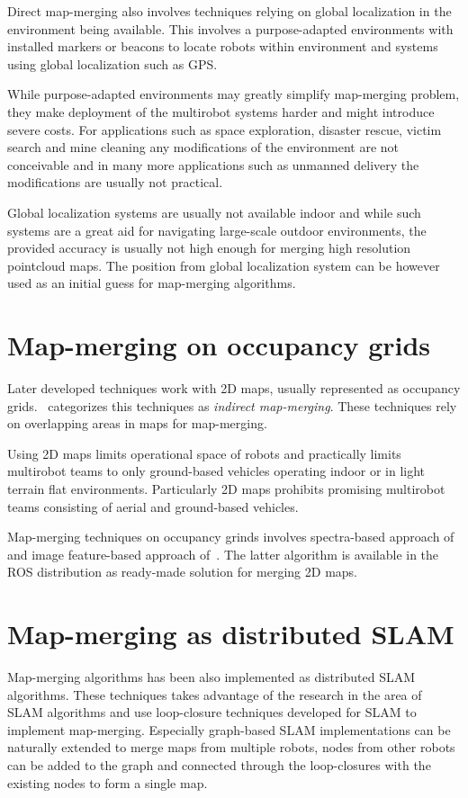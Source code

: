 Direct map-merging also involves techniques relying on global localization in the environment being available. This involves a purpose-adapted environments with installed markers or beacons to locate robots within environment and systems using global localization such as \gls{GPS}.

While purpose-adapted environments may greatly simplify map-merging problem, they make deployment of the multirobot systems harder and might introduce severe costs. For applications such as space exploration, disaster rescue, victim search and mine cleaning any modifications of the environment are not conceivable and in many more applications such as unmanned delivery the modifications are usually not practical.

Global localization systems are usually not available indoor and while such systems are a great aid for navigating large-scale outdoor environments, the provided accuracy is usually not high enough for merging high resolution pointcloud maps. The position from global localization system can be however used as an initial guess for map-merging algorithms.

\section{Map-merging on occupancy grids}

Later developed techniques work with 2D maps, usually represented as occupancy grids. \cite{lee2012survey}~categorizes this techniques as \textit{indirect map-merging}. These techniques rely on overlapping areas in maps for map-merging.

Using 2D maps limits operational space of robots and practically limits multirobot teams to only ground-based vehicles operating indoor or in light terrain flat environments. Particularly 2D maps prohibits promising multirobot teams consisting of aerial and ground-based vehicles.

Map-merging techniques on occupancy grinds involves spectra-based approach of~\cite{carpin2008spectra} and image feature-based approach of~\cite{Horner2016}. The latter algorithm is available in the \gls{ROS} distribution as ready-made solution for merging 2D maps.

\section{Map-merging as distributed SLAM}

Map-merging algorithms has been also implemented as distributed \gls{SLAM} algorithms. These techniques takes advantage of the research in the area of \gls{SLAM} algorithms and use loop-closure techniques developed for \gls{SLAM} to implement map-merging. Especially graph-based \gls{SLAM} implementations can be naturally extended to merge maps from multiple robots, nodes from other robots can be added to the graph and connected through the loop-closures with the existing nodes to form a single map.

